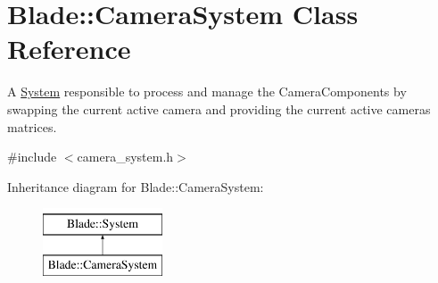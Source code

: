 \hypertarget{class_blade_1_1_camera_system}{}\section{Blade\+:\+:Camera\+System Class Reference}
\label{class_blade_1_1_camera_system}


A \hyperlink{class_blade_1_1_system}{System} responsible to process and manage the Camera\+Components by swapping the current active camera and providing the current active camera\textquotesingle{}s matrices.  




{\ttfamily \#include $<$camera\+\_\+system.\+h$>$}

Inheritance diagram for Blade\+:\+:Camera\+System\+:\begin{figure}[H]
\begin{center}
\leavevmode
\includegraphics[height=2.000000cm]{class_blade_1_1_camera_system}
\end{center}
\end{figure}
